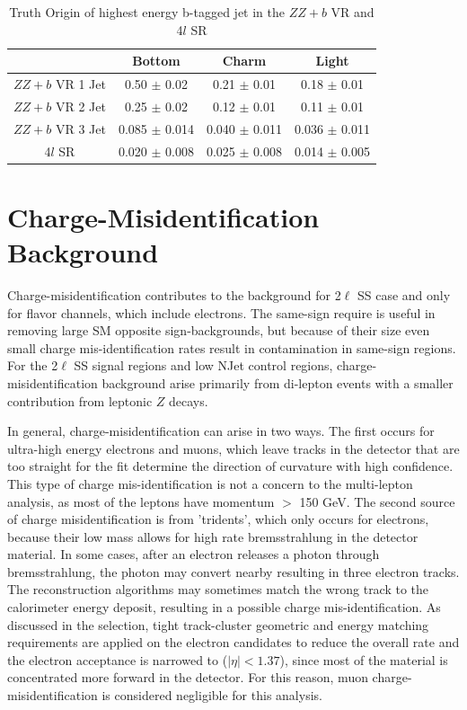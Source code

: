 \begin{table}[htbp]
\centering 
\begin{tabular}{|c|c|c|c|} 
  \hline
                 & Bottom      & Charm       & Light \\
  \hline
  $ZZ+b$ VR 1 Jet& 0.50  $\pm$ 0.02  & 0.21  $\pm$ 0.01  & 0.18  $\pm$ 0.01 \\ 
  $ZZ+b$ VR 2 Jet& 0.25  $\pm$ 0.02  & 0.12  $\pm$ 0.01  & 0.11  $\pm$ 0.01 \\ 
  $ZZ+b$ VR 3 Jet& 0.085 $\pm$ 0.014 & 0.040 $\pm$ 0.011 & 0.036 $\pm$ 0.011 \\
  4$l$ SR        & 0.020 $\pm$ 0.008 & 0.025 $\pm$ 0.008 & 0.014 $\pm$ 0.005 \\
  \hline 
\end{tabular}
\caption{Truth Origin of highest energy b-tagged jet in the $ZZ+b$ VR and 4$l$ SR} 
\label{table:zz_truth}
\end{table} 


\section{Charge-Misidentification Background }
\label{section:qmis} 
Charge-misidentification contributes to the background for 2$\ell$ SS case and only for flavor channels, which include electrons. The same-sign require is useful in removing large SM opposite sign-backgrounds, but because of their size even small charge mis-identification rates result in contamination in same-sign regions. For the 2$\ell$ SS signal regions and low NJet control regions, charge-misidentification background arise primarily from \ttbar di-lepton events with a smaller contribution from leptonic $Z$ decays. 

In general, charge-misidentification can arise in two ways. The first occurs for ultra-high energy electrons and muons, which leave tracks in the detector that are too straight for the fit determine the direction of curvature with high confidence. This type of charge mis-identification is not a concern to the \tth multi-lepton analysis, as most of the leptons have momentum $>$ 150 GeV. The second source of charge misidentification is from 'tridents', which only occurs for electrons, because their low mass allows for high rate bremsstrahlung in the detector material. In some cases, after an electron releases a photon through bremsstrahlung, the photon may convert nearby resulting in three electron tracks. The reconstruction algorithms may sometimes match the wrong track to the calorimeter energy deposit, resulting in a possible charge mis-identification. As discussed in the selection, tight track-cluster geometric and energy matching requirements are applied on the electron candidates to reduce the overall rate and the electron acceptance is narrowed to ($|\eta| < 1.37$), since most of the material is concentrated more forward in the detector. For this reason, muon charge-misidentification is considered negligible for this analysis.

